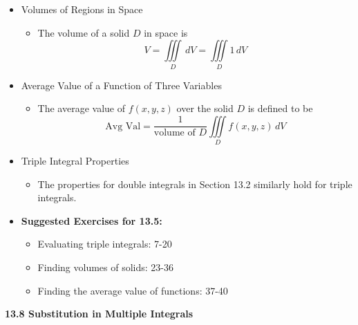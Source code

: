 \documentclass[12pt]{article}
\newcommand{\<}{\left<}
\renewcommand{\>}{\right>}
\begin{document}
\begin{itemize}
  \item Volumes of Regions in Space
    
    \begin{itemize}
    \item The volume of a solid $D$ in space is \[V = \iiint\limits_D\,dV=\iiint\limits_D 1\,dV\]
    \end{itemize}
    
  \item Average Value of a Function of Three Variables
  
    \begin{itemize}
    \item The average value of $f(x,y,z)$ over the solid $D$ is defined to be \[\textrm{Avg Val} = \frac{1}{\textrm{volume of }D}\iiint\limits_D f(x,y,z)\,dV\]
    \end{itemize}
    
  \item Triple Integral Properties
  
    \begin{itemize}
    \item The properties for double integrals in Section 13.2 similarly hold for triple integrals.
    \end{itemize}
        
  \item \textbf{Suggested Exercises for 13.5:}
  
    \begin{itemize}
    \item Evaluating triple integrals: 7-20
    \item Finding volumes of solids: 23-36
    \item Finding the average value of functions: 37-40
    \end{itemize}
    
  \end{itemize}
  
  \newpage
  
  \centerline{\bf 13.8 Substitution in Multiple Integrals}
  
\end{document}
